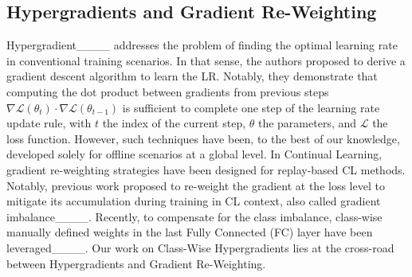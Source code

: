 \subsection{Hypergradients and Gradient Re-Weighting}
Hypergradient____ addresses the problem of finding the optimal learning rate in conventional training scenarios. In that sense, the authors proposed to derive a gradient descent algorithm to learn the LR. Notably, they demonstrate that computing the dot product between gradients from previous steps $\nabla\mathcal{L}(\theta_t) \cdot \nabla\mathcal{L}(\theta_{t-1})$ is sufficient to complete one step of the learning rate update rule, with $t$ the index of the current step, $\theta$ the parameters, and $\mathcal{L}$ the loss function. However, such techniques have been, to the best of our knowledge, developed solely for offline scenarios at a global level. In Continual Learning, gradient re-weighting strategies have been designed for replay-based CL methods. Notably, previous work proposed to re-weight the gradient at the loss level to mitigate its accumulation during training in CL context, also called gradient imbalance____. Recently, to compensate for the class imbalance, class-wise manually defined weights in the last Fully Connected (FC) layer have been leveraged____. Our work on Class-Wise Hypergradients lies at the cross-road between Hypergradients and Gradient Re-Weighting.


